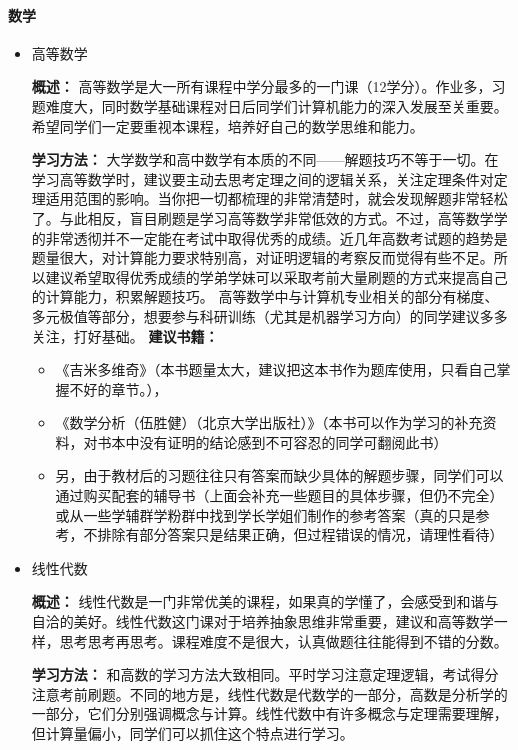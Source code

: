 \documentclass[
decoration,  %
]{qyxf-book}
\begin{document}
\paragraph{数学}
\begin{itemize}
	\item 高等数学 
	\par 
	\textbf{概述：} 高等数学是大一所有课程中学分最多的一门课（12学分）。作业多，习题难度大，同时数学基础课程对日后同学们计算机能力的深入发展至关重要。希望同学们一定要重视本课程，培养好自己的数学思维和能力。
	
	\textbf{学习方法：}
	大学数学和高中数学有本质的不同——解题技巧不等于一切。在学习高等数学时，建议要主动去思考定理之间的逻辑关系，关注定理条件对定理适用范围的影响。当你把一切都梳理的非常清楚时，就会发现解题非常轻松了。与此相反，盲目刷题是学习高等数学非常低效的方式。不过，高等数学学的非常透彻并不一定能在考试中取得优秀的成绩。近几年高数考试题的趋势是题量很大，对计算能力要求特别高，对证明逻辑的考察反而觉得有些不足。所以建议希望取得优秀成绩的学弟学妹可以采取考前大量刷题的方式来提高自己的计算能力，积累解题技巧。
	高等数学中与计算机专业相关的部分有梯度、多元极值等部分，想要参与科研训练（尤其是机器学习方向）的同学建议多多关注，打好基础。
	\textbf{建议书籍：}
	\begin{itemize}
		\item 《吉米多维奇》（本书题量太大，建议把这本书作为题库使用，只看自己掌握不好的章节。），
		\item 《数学分析（伍胜健）（北京大学出版社）》（本书可以作为学习的补充资料，对书本中没有证明的结论感到不可容忍的同学可翻阅此书）
		\item 另，由于教材后的习题往往只有答案而缺少具体的解题步骤，同学们可以通过购买配套的辅导书（上面会补充一些题目的具体步骤，但仍不完全）或从一些学辅群学粉群中找到学长学姐们制作的参考答案（真的只是参考，不排除有部分答案只是结果正确，但过程错误的情况，请理性看待）
	\end{itemize}
	
	
	\item 线性代数
	\par
	\textbf{概述：} 线性代数是一门非常优美的课程，如果真的学懂了，会感受到和谐与自洽的美好。线性代数这门课对于培养抽象思维非常重要，建议和高等数学一样，思考思考再思考。课程难度不是很大，认真做题往往能得到不错的分数。
	
	
	\textbf{学习方法：}
	和高数的学习方法大致相同。平时学习注意定理逻辑，考试得分注意考前刷题。不同的地方是，线性代数是代数学的一部分，高数是分析学的一部分，它们分别强调概念与计算。线性代数中有许多概念与定理需要理解，但计算量偏小，同学们可以抓住这个特点进行学习。
	

\end{itemize}
\end{document}

